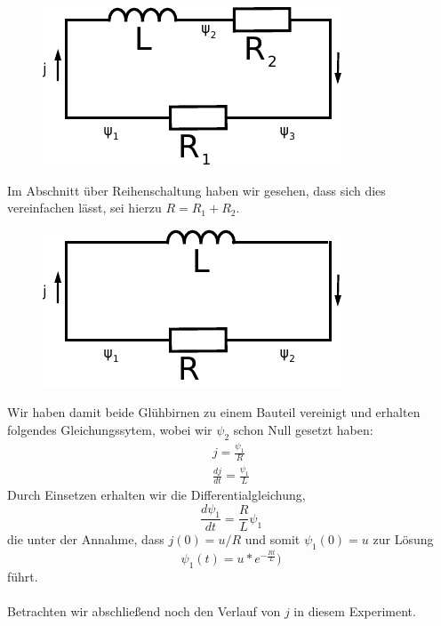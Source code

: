 \documentclass[11pt,a4paper,leqno]{report}
\numberwithin{equation}{chapter}
\begin{document}
  \begin{figure}[H]
	\begin{center}
		\includegraphics[scale=1]{spuledir2.pdf}
	\end{center}
\end{figure}
\noindent
Im Abschnitt \"uber Reihenschaltung haben wir gesehen, dass sich dies vereinfachen l\"asst, sei hierzu $R = R_1 + R_2$.
  \begin{figure}[H]
	\begin{center}
		\includegraphics[scale=1]{spuledir3.pdf}
	\end{center}
\end{figure}
\noindent
Wir haben damit beide Gl\"uhbirnen zu einem Bauteil vereinigt und erhalten folgendes Gleichungssytem, wobei wir $\psi_2$ schon Null gesetzt haben:
 \begin{align} 
j = \frac{\psi_1}{R}\\
\frac{dj}{dt} = \frac{\psi_1}{L}
\end{align}
Durch Einsetzen erhalten wir die Differentialgleichung,
\begin{equation}
\frac{d\psi_1}{dt} = \frac{R}{L}\psi_1
\end{equation}  
die unter der Annahme, dass $j(0) = u/R$ und somit $\psi_1(0)=u$ zur L\"osung
\begin{equation*}
\psi_1(t) = u * e^{-\frac{R t}{L}})
\end{equation*}  
f\"uhrt.\\
\\
Betrachten wir abschlie\ss{}end noch den Verlauf von $j$ in diesem Experiment.
\end{document}

